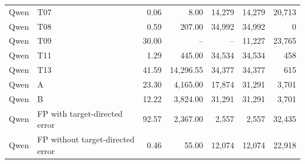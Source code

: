 \begin{table}[t]
\begin{tabular}{llrrrrr}
Qwen & T07 & 0.06 & 8.00 & 14,279 & 14,279 & 20,713 \\
Qwen & T08 & 0.59 & 207.00 & 34,992 & 34,992 & 0 \\
Qwen & T09 & 30.00 & -- & -- & 11,227 & 23,765 \\
Qwen & T11 & 1.29 & 445.00 & 34,534 & 34,534 & 458 \\
Qwen & T13 & 41.59 & 14,296.55 & 34,377 & 34,377 & 615 \\
Qwen & A & 23.30 & 4,165.00 & 17,874 & 31,291 & 3,701 \\
Qwen & B & 12.22 & 3,824.00 & 31,291 & 31,291 & 3,701 \\
Qwen & FP with target-directed error & 92.57 & 2,367.00 & 2,557 & 2,557 & 32,435 \\
Qwen & FP without target-directed error & 0.46 & 55.00 & 12,074 & 12,074 & 22,918 \\
\bottomrule
\end{tabular}

\end{table}
